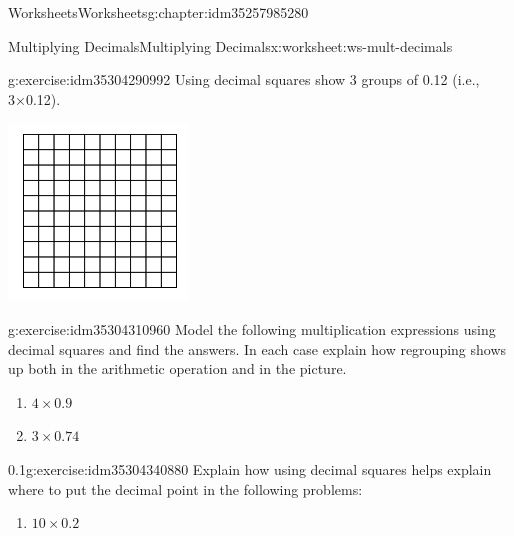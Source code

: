\documentclass[twoside,11pt,]{book}
\begin{document}
\begin{chapterptx}{Worksheets}{}{Worksheets}{}{}{g:chapter:idm35257985280}
\begin{worksheet-section-numberless}{Multiplying Decimals}{}{Multiplying Decimals}{}{}{x:worksheet:ws-mult-decimals}
\begin{divisionexercise}{1}{}{}{g:exercise:idm35304290992}
Using decimal squares show 3 groups of 0.12 (i.e., 3×0.12).%
\begin{sidebyside}{1}{0.25}{0.25}{0}%
\begin{sbspanel}{0.5}%
\includegraphics[width=1\linewidth]{images/decimal-square.png}
\end{sbspanel}%
\end{sidebyside}%
\end{divisionexercise}%
\begin{divisionexercise}{2}{}{}{g:exercise:idm35304310960}%
Model the following multiplication expressions using decimal squares and find the answers. In each case explain how regrouping shows up both in the arithmetic operation and in the picture.%
%
\begin{enumerate}[label=(\alph*)]
\item{}\(4 \times 0.9 \)%
\item{}\(3 \times 0.74 \)%
\end{enumerate}
\end{divisionexercise}%
\begin{divisionexercise}{3}{}{0.1}{g:exercise:idm35304340880}%
Explain how using decimal squares helps explain where to put the decimal point in the following problems:%
%
\begin{enumerate}[label=(\alph*)]
\item{}\(10 \times 0.2 \)%

\end{enumerate}
\end{divisionexercise}
\end{worksheet-section-numberless}
\end{chapterptx}
\end{document}
